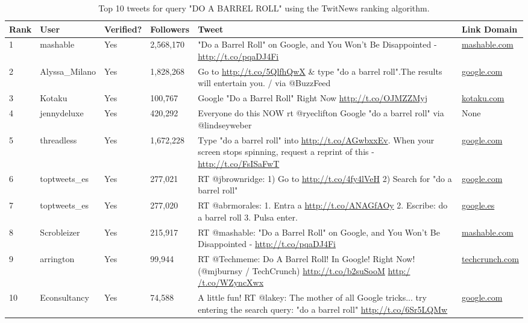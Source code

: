\documentclass[10pt]{proc}
\begin{document}
    \begin{table*}[p]
      \begin{tabular}{| l | l | l | l | p{6.5cm} | p{2cm} |}
        \hline
        Rank & User & Verified? & Followers & Tweet & Link Domain \\
        \hline
        1 & mashable & Yes & 2,568,170 & "Do a Barrel Roll" on Google, and You Won't Be Disappointed - \url{http://t.co/pqaDJ4Fi} & \url{mashable.com} \\
        \hline
        2 & Alyssa\_Milano & Yes & 1,828,268 & Go to \url{http://t.co/5QlfhQwX} \& type "do a barrel roll".The results will entertain you. / via @BuzzFeed & \url{google.com} \\
        \hline
        3 & Kotaku & Yes & 100,767 & Google "Do a Barrel Roll" Right Now \url{http://t.co/OJMZZMyj} & \url{kotaku.com} \\
        \hline
        4 & jennydeluxe & Yes & 420,292 & Everyone do this NOW rt @ryeclifton Google "do a barrel roll" via @lindseyweber & None \\
        \hline
        5 & threadless & Yes & 1,672,228 & Type "do a barrel roll" into \url{http://t.co/AGwbxxEv}. When your screen stops spinning, request a reprint of this - \url{http://t.co/FsISaFwT} & \url{google.com} \\
        \hline
        6 & toptweets\_es & Yes & 277,021 & RT @jbrownridge: 1) Go to \url{http://t.co/4fy4lVeH} 2) Search for "do a barrel roll" & \url{google.com} \\
        \hline
        7 & toptweets\_es & Yes & 277,020 & RT @abrmorales: 1. Entra a \url{http://t.co/ANAGfAOy} 2. Escribe: do a barrel roll 3. Pulsa enter. & \url{google.es} \\
        \hline
        8 & Scrobleizer & Yes & 215,917 & RT @mashable: "Do a Barrel Roll" on Google, and You Won't Be Disappointed - \url{http://t.co/pqaDJ4Fi} & \url{mashable.com} \\
        \hline
        9 & arrington & Yes & 99,944 & RT @Techmeme: Do A Barrel Roll! In Google! Right Now! (@mjburnsy / TechCrunch) \url{http://t.co/b2suSooM} \url{http:/ /t.co/WZyncXwx} & \url{techcrunch.com} \\
        \hline
        10 & Econsultancy & Yes & 74,588 & A little fun! RT @lakey: The mother of all Google tricks... try entering the search query: "do a barrel roll" \url{http://t.co/6Sr5LQMw} & \url{google.com} \\
        \hline
      \end{tabular}
      \caption{Top 10 tweets for query "DO A BARREL ROLL" using the TwitNews ranking algorithm.}
      \label{BarrelRollRanking}      
    \end{table*}
    
\end{document}
